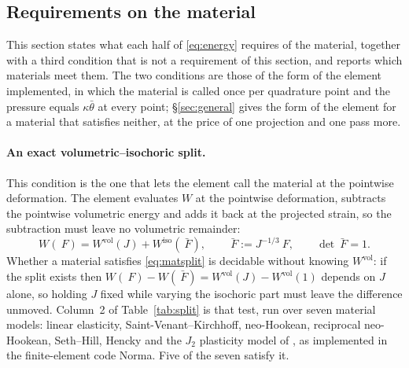 \documentclass[11pt]{article}
\newcommand{\F}{~F}
\newcommand{\supvol}{^{\mathrm{vol}}}
\newcommand{\supiso}{^{\mathrm{iso}}}
\theoremstyle{definition}
\theoremstyle{plain}
\begin{document}
\subsection{Requirements on the material}
\label{sec:matreq}

This section states what each half of \eqref{eq:energy} requires of the
material, together with a third condition that is not a requirement of this
section, and reports which materials meet them. The two conditions are
those of the form of the element implemented, in which the material is
called once per quadrature point and the pressure equals $\kappa\bar\theta$
at every point; \S\ref{sec:general} gives the form of the element for a
material that satisfies neither, at the price of one projection and one
pass more.

\paragraph{An exact volumetric--isochoric split.} This condition is
the one that lets the element call the material at the pointwise
deformation. The
element evaluates $W$ at the pointwise deformation, subtracts the pointwise
volumetric energy and adds it back at the projected strain, so the subtraction
must leave no volumetric remainder:
\begin{equation}
  \label{eq:matsplit}
  W(\F) = W\supvol(J) + W\supiso(\bar{\F}),
  \qquad
  \bar{\F} := J^{-1/3}\F,
  \qquad
  \det\bar{\F} = 1 .
\end{equation}
Whether a material satisfies \eqref{eq:matsplit} is decidable without knowing
$W\supvol$: if the split exists then $W(\F) - W(\bar{\F}) = W\supvol(J) -
W\supvol(1)$ depends on $J$ alone, so holding $J$ fixed while varying the
isochoric part must leave the difference unmoved. Column~2 of
Table~\ref{tab:split} is that test, run over seven material models: linear
elasticity, Saint-Venant--Kirchhoff, neo-Hookean, reciprocal neo-Hookean,
Seth--Hill, Hencky and the $J_2$ plasticity model of \citet{SimoHughes:1998},
as implemented in the finite-element code Norma. Five of the seven satisfy
it.
\end{document}
